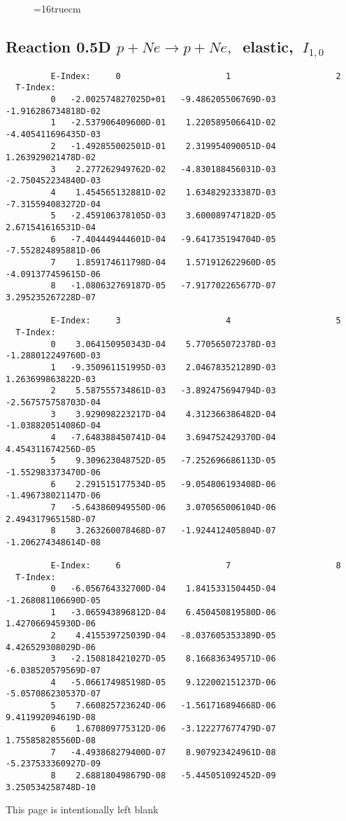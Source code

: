 \documentclass[12pt]{article}
\begin{document}
\begin{figure} \label{0.5T}
\epsfxsize=16truecm
\end{figure}
\newpage

\subsection{
Reaction 0.5D  $p + Ne \rightarrow p + Ne ,\ $
 elastic, $\  I_{1,0}$
}

\begin{small}\begin{verbatim}
         E-Index:     0                     1                     2
  T-Index:
         0   -2.002574827025D+01   -9.486205506769D-03   -1.916286734818D-02
         1   -2.537906409600D-01    1.220589506641D-02   -4.405411696435D-03
         2   -1.492855002501D-01    2.319954090051D-04    1.263929021478D-02
         3    2.277262949762D-02   -4.830188456031D-03   -2.750452234840D-03
         4    1.454565132881D-02    1.634829233387D-03   -7.315594083272D-04
         5   -2.459106378105D-03    3.600089747182D-05    2.671541616531D-04
         6   -7.404449444601D-04   -9.641735194704D-05   -7.552824895881D-06
         7    1.859174611798D-04    1.571912622960D-05   -4.091377459615D-06
         8   -1.080632769187D-05   -7.917702265677D-07    3.295235267228D-07
 
         E-Index:     3                     4                     5
  T-Index:
         0    3.064150950343D-04    5.770565072378D-03   -1.288012249760D-03
         1   -9.350961151995D-03    2.046783521289D-03    1.263699863822D-03
         2    5.587555734861D-03   -3.892475694794D-03   -2.567575758703D-04
         3    3.929098223217D-04    4.312366386482D-04   -1.038820514086D-04
         4   -7.648388450741D-04    3.694752429370D-04    4.454311674256D-05
         5    9.309623048752D-05   -7.252696686113D-05   -1.552983373470D-06
         6    2.291515177534D-05   -9.054806193408D-06   -1.496738021147D-06
         7   -5.643860949550D-06    3.070565006104D-06    2.494317965158D-07
         8    3.263260078468D-07   -1.924412405804D-07   -1.206274348614D-08
 
         E-Index:     6                     7                     8
  T-Index:
         0   -6.056764332700D-04    1.841533150445D-04   -1.268081106690D-05
         1   -3.065943896812D-04    6.450450819580D-06    1.427066945930D-06
         2    4.415539725039D-04   -8.037605353389D-05    4.426529308029D-06
         3   -2.150818421027D-05    8.166836349571D-06   -6.038520579569D-07
         4   -5.066174985198D-05    9.122002151237D-06   -5.057086230537D-07
         5    7.660825723624D-06   -1.561716894668D-06    9.411992094619D-08
         6    1.670809775312D-06   -3.122277677479D-07    1.755858285560D-08
         7   -4.493868279400D-07    8.907923424961D-08   -5.237533360927D-09
         8    2.688180498679D-08   -5.445051092452D-09    3.250534258748D-10

\end{verbatim}\end{small}
\newpage
This page is intentionally left blank
\newpage
\end{document}
